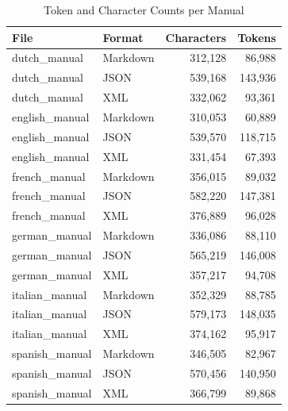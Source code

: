 \begin{table}[H]
    \centering
    \caption{Token and Character Counts per Manual}
    \label{tab:token_counts}
    \small
    \begin{tabular}{llrr}
        \toprule
        \textbf{File} & \textbf{Format} & \textbf{Characters} & \textbf{Tokens} \\
        \midrule
        dutch\_manual & Markdown & 312,128 & 86,988 \\
        dutch\_manual & JSON & 539,168 & 143,936 \\
        dutch\_manual & XML & 332,062 & 93,361 \\
        english\_manual & Markdown & 310,053 & 60,889 \\
        english\_manual & JSON & 539,570 & 118,715 \\
        english\_manual & XML & 331,454 & 67,393 \\
        french\_manual & Markdown & 356,015 & 89,032 \\
        french\_manual & JSON & 582,220 & 147,381 \\
        french\_manual & XML & 376,889 & 96,028 \\
        german\_manual & Markdown & 336,086 & 88,110 \\
        german\_manual & JSON & 565,219 & 146,008 \\
        german\_manual & XML & 357,217 & 94,708 \\
        italian\_manual & Markdown & 352,329 & 88,785 \\
        italian\_manual & JSON & 579,173 & 148,035 \\
        italian\_manual & XML & 374,162 & 95,917 \\
        spanish\_manual & Markdown & 346,505 & 82,967 \\
        spanish\_manual & JSON & 570,456 & 140,950 \\
        spanish\_manual & XML & 366,799 & 89,868 \\
        \bottomrule
    \end{tabular}
\end{table}